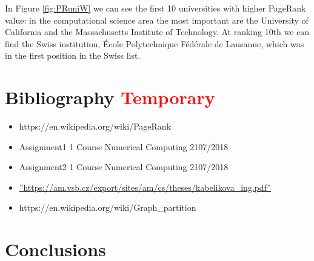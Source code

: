\documentclass[]{usiinfbachelorproject}
\begin{document}
In Figure \ref{fig:PRuniW} we can see the first 10 universities with higher PageRank value: in the computational science area the most important are the University of California and the Massachusetts Institute of Technology. At ranking 10th we can find the Swiss institution, \'{E}cole Polytechnique F\'{e}d\'{e}rale de Lausanne, which was in the first position in the Swiss list.




\newpage
\section{Bibliography  \textcolor{red}{Temporary}}
\begin{itemize}
\item https://en.wikipedia.org/wiki/PageRank
\item Assignment1 1 Course Numerical Computing 2107/2018
\item Assignment2 1 Course Numerical Computing 2107/2018
\item \hyperref[label_name]{''https://am.vsb.cz/export/sites/am/cs/theses/kabelikova\_ing.pdf''}
\item https://en.wikipedia.org/wiki/Graph\_partition
\end{itemize}







\section{Conclusions} \label{sec:conclusions}
\end{document}

